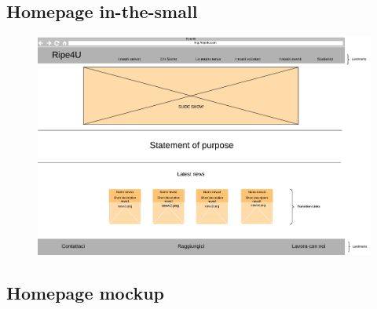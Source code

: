         \subsection{Homepage in-the-small}
        \begin{figure}[H]
            \centering
            \includegraphics[scale=0.37]{resources/images/homepage-in-the-small.jpg}
        \end{figure}
        \subsection{Homepage mockup}


    
